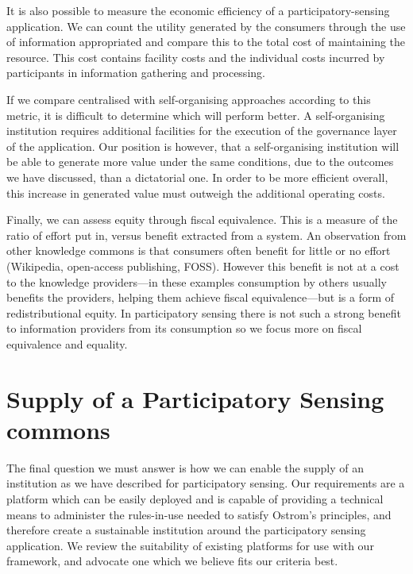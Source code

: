 It is also possible to measure the economic efficiency of a participatory-sensing application. We can count the utility generated by the consumers through the use of information appropriated and compare this to the total cost of maintaining the resource. This cost contains facility costs and the individual costs incurred by participants in information gathering and processing.

If we compare centralised with self-organising approaches according to this metric, it is difficult to determine which will perform better. 
A self-organising institution requires additional facilities for the execution of the governance layer of the application. 
Our position is however, that a self-organising institution will be able to generate more value under the same conditions, due to the outcomes we have discussed, than a dictatorial one. 
In order to be more efficient overall, this increase in generated value must outweigh the additional operating costs.

Finally, we can assess equity through fiscal equivalence. 
This is a measure of the ratio of effort put in, versus benefit extracted from a system. 
An observation from other knowledge commons is that consumers often benefit for little or no effort (\eg Wikipedia, open-access publishing, FOSS). However this benefit is not at a cost to the knowledge providers---in these examples consumption by others usually benefits the providers, helping them achieve fiscal equivalence---but is a form of redistributional equity. In participatory sensing there is not such a strong benefit to information providers from its consumption so we focus more on fiscal equivalence and equality.

\section{Supply of a Participatory Sensing commons}


The final question we must answer is how we can enable the supply of an institution as we have described for participatory sensing. 
Our requirements are a platform which can be easily deployed and is capable of providing a technical means to administer the rules-in-use needed to satisfy Ostrom's principles, and therefore create a sustainable institution around the participatory sensing application. 
We review the suitability of existing platforms for use with our framework, and advocate one which we believe fits our criteria best.


